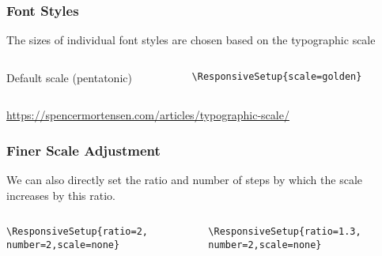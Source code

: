 \begin{frame}[fragile]
  \frametitle{Font Styles}

  The sizes of individual font styles are chosen based on the typographic scale

\begin{columns}
  \begin{column}{0.5\textwidth}
Default scale (pentatonic)

\end{column}
  \begin{column}{0.5\textwidth}
\begin{verbatim}
\ResponsiveSetup{scale=golden}
\end{verbatim}

\end{column}
\end{columns}
\url{https://spencermortensen.com/articles/typographic-scale/}

\end{frame}

\begin{frame}[fragile]
  \frametitle{Finer Scale Adjustment}

  We can also directly set the ratio and number of steps by which the scale increases by this ratio.

\begin{columns}
  \begin{column}{0.5\textwidth}
\begin{verbatim}
\ResponsiveSetup{ratio=2,
number=2,scale=none}
\end{verbatim}

\end{column}
  \begin{column}{0.5\textwidth}
\begin{verbatim}
\ResponsiveSetup{ratio=1.3,
number=2,scale=none}
\end{verbatim}

\end{column}
\end{columns}

\end{frame}

